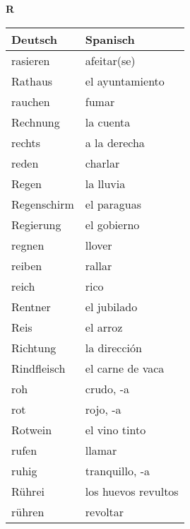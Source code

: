 \begin{flushright}\begin{Huge}\textbf{R}\end{Huge}\end{flushright}

\begin{longtable}{p{} p{}} 
\textbf{Deutsch}     & \textbf{Spanisch}                                       \\ \hline
\hline
\endhead %
rasieren & afeitar(se)\\
Rathaus & el ayuntamiento\\
rauchen & fumar\\
Rechnung & la cuenta\\
rechts & a la derecha\\
reden & charlar\\
Regen & la lluvia\\
Regenschirm & el paraguas\\
Regierung & el gobierno\\
regnen & llover\\
reiben & rallar\\
reich & rico\\
Rentner & el jubilado \\
Reis & el arroz\\
Richtung & la dirección\\
Rindfleisch & el carne de vaca\\
roh & crudo, -a\\
rot & rojo, -a\\
Rotwein & el vino tinto \\
rufen & llamar \\
ruhig & tranquillo, -a\\
Rührei & los huevos revultos\\
rühren & revoltar\\

\end{longtable}
